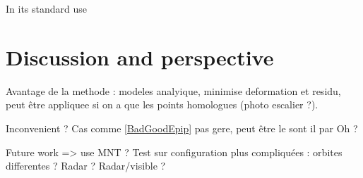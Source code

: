 \documentclass{ipol}
\begin{document}
In its standard use
    

\section{Discussion and perspective}

Avantage de la methode : modeles analyique, minimise deformation et residu, peut être appliquee 
si on a que les points homologues (photo escalier ?).

Inconvenient ? Cas comme \ref{BadGoodEpip} pas gere, peut être le sont il par Oh ?

Future work => use MNT ? Test sur configuration plus compliquées : orbites differentes ? Radar ? Radar/visible ?










%
%
%
\end{document}
